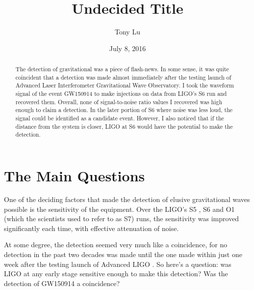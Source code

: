 \documentclass[aps,prd,preprint]{revtex4}
\begin{document}
\pagestyle{pioneer}
\date{July 8, 2016}
\preprint{}
\title{Undecided Title}
\author{Tony Lu}

\begin{abstract}
The detection of gravitational was a piece of flash-news. In some sense, it was quite coincident that a detection was made almost immediately after the testing launch of Advanced Laser Interferometer Gravitational Wave Observatory. I took the waveform signal of the event GW150914 to make injections on data from LIGO's S6 run and recovered them. Overall, none of signal-to-noise ratio values I recovered was high enough to claim a detection. In the later portion of S6 where noise was less loud, the signal could be identified as a candidate event. However, I also noticed that if the distance from the system is closer, LIGO at S6 would have the potential to make the detection.
\end{abstract}
\maketitle



\section{The Main Questions}
One of the deciding factors that made the detection of elusive gravitational waves possible is the sensitivity of the equipment. Over the LIGO's S5 \cite{S5}, S6 \cite{S6} and O1 \cite{O1} (which the scientists used to refer to as S7) runs, the sensitivity was improved significantly each time, with effective attenuation of noise.
\par At some degree, the detection seemed very much like a coincidence, for no detection in the past two decades was made until the one made within just one week after the testing launch of Advanced LIGO \cite{timeline}. So here's a question: was LIGO at any early stage sensitive enough to make this detection? Was the detection of GW150914 a coincidence?
\end{document}
